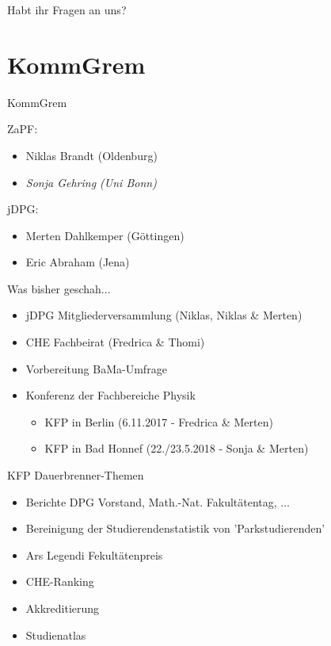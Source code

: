 \documentclass[compress, aspectratio=169]{beamer}
\begin{document}
\begin{frame}[plain]
  \begin{center}
    \Huge Habt ihr Fragen an uns?
    \end{center}
\end{frame}

\section{KommGrem}

 \begin{frame}{KommGrem}
  
  ZaPF:
  \begin{itemize}
   \item Niklas Brandt (Oldenburg)
   \item \textit{Sonja Gehring (Uni Bonn)}
  \end{itemize}
  
  jDPG:
  \begin{itemize}
   \item Merten Dahlkemper (Göttingen)
   \item Eric Abraham (Jena)
  \end{itemize}

 \end{frame}
 

 \begin{frame}{Was bisher geschah...}
  \begin{itemize}
   \item jDPG Mitgliederversammlung (Niklas, Niklas \& Merten)
   \item CHE Fachbeirat (Fredrica \& Thomi)
   \item Vorbereitung BaMa-Umfrage
   \item Konferenz der Fachbereiche Physik
   \begin{itemize}
    \item KFP in Berlin (6.11.2017 - Fredrica \& Merten)
    \item KFP in Bad Honnef (22./23.5.2018 - Sonja \& Merten)
   \end{itemize}
  \end{itemize}
 \end{frame}
 
 
 \begin{frame}{KFP Dauerbrenner-Themen}
  \begin{itemize}
   \item Berichte DPG Vorstand, Math.-Nat. Fakultätentag, ... 
   \item Bereinigung der Studierendenstatistik von 'Parkstudierenden'
   \item Ars Legendi Fekultätenpreis
   \item CHE-Ranking
   \item Akkreditierung
   \item Studienatlas
  \end{itemize}
 \end{frame}
 
\end{document}
